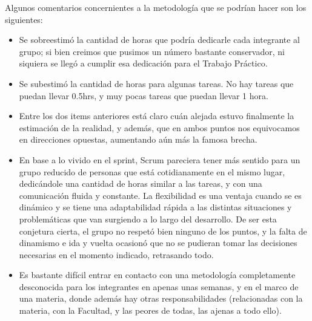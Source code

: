 Algunos comentarios concernientes a la metodología que se podrían hacer son los siguientes:
\begin{itemize}
 \item Se sobreestimó la cantidad de horas que podría dedicarle cada integrante al grupo; si bien creimos que pusimos un número bastante conservador, ni siquiera se llegó a cumplir esa dedicación para el Trabajo Práctico. 
 \item Se subestimó la cantidad de horas para algunas tareas. No hay tareas que puedan llevar 0.5hrs, y muy pocas tareas que puedan llevar 1 hora. 
 \item Entre los dos items anteriores está claro cuán alejada estuvo finalmente la estimación de la realidad, y además, que en ambos puntos nos equivocamos en direcciones opuestas, aumentando aún más la famosa brecha.
 \item En base a lo vivido en el sprint, Scrum pareciera tener más sentido para un grupo reducido de personas que está cotidianamente en el mismo lugar, dedicándole una cantidad de horas similar a las tareas, y con una comunicación fluida y constante. La flexibilidad es una ventaja cuando se es dinámico y se tiene una adaptabilidad rápida a las distintas situaciones y problemáticas que van surgiendo a lo largo del desarrollo. De ser esta conjetura cierta, el grupo no respetó bien ninguno de los puntos, y la falta de dinamismo e ida y vuelta ocasionó que no se pudieran tomar las decisiones necesarias en el momento indicado, retrasando todo.
 \item Es bastante difícil entrar en contacto con una metodología completamente desconocida para los integrantes en apenas unas semanas, y en el marco de una materia, donde además hay otras responsabilidades (relacionadas con la materia, con la Facultad, y las peores de todas, las ajenas a todo ello).
\end{itemize}


